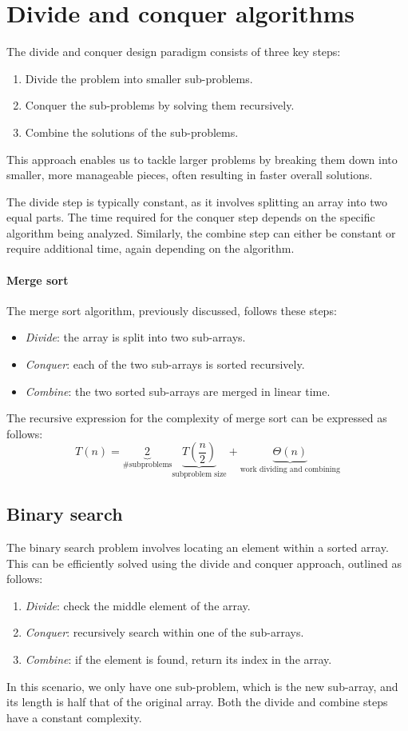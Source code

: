 \section{Divide and conquer algorithms}

The divide and conquer design paradigm consists of three key steps:
\begin{enumerate}
    \item Divide the problem into smaller sub-problems. 
    \item Conquer the sub-problems by solving them recursively. 
    \item Combine the solutions of the sub-problems.
\end{enumerate}
This approach enables us to tackle larger problems by breaking them down into smaller, more manageable pieces, often resulting in faster overall solutions.

The divide step is typically constant, as it involves splitting an array into two equal parts. 
The time required for the conquer step depends on the specific algorithm being analyzed.
Similarly, the combine step can either be constant or require additional time, again depending on the algorithm.

\paragraph*{Merge sort}
The merge sort algorithm, previously discussed, follows these steps:
\begin{itemize}
    \item \textit{Divide}: the array is split into two sub-arrays.
    \item \textit{Conquer}: each of the two sub-arrays is sorted recursively.
    \item \textit{Combine}: the two sorted sub-arrays are merged in linear time.
\end{itemize}
The recursive expression for the complexity of merge sort can be expressed as follows:
\[T(n)=\underbrace{2}_{\#\text{subproblems}} \underbrace{T\left(\dfrac{n}{2}\right)}_{\text{subproblem size}}+\underbrace{\Theta(n)}_\text{work dividing and combining}\]

\subsection{Binary search}
The binary search problem involves locating an element within a sorted array. 
This can be efficiently solved using the divide and conquer approach, outlined as follows:
\begin{enumerate}
    \item \textit{Divide}: check the middle element of the array.
    \item \textit{Conquer}: recursively search within one of the sub-arrays.
    \item \textit{Combine}: if the element is found, return its index in the array.
\end{enumerate}
In this scenario, we only have one sub-problem, which is the new sub-array, and its length is half that of the original array.
Both the divide and combine steps have a constant complexity.

